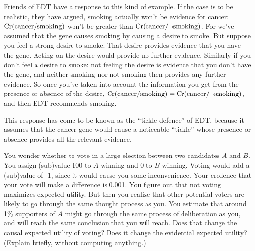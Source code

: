 Friends of EDT have a response to this kind of example. If the case is
to be realistic, they have argued, smoking actually won't be evidence
for cancer: $\text{Cr}(\text{cancer}/\text{smoking})$ won't be greater than
$\text{Cr}(\text{cancer}/\neg \text{smoking})$. For we've assumed that the
gene causes smoking by causing a desire to smoke. But suppose you feel
a strong desire to smoke. That desire provides evidence that you have
the gene. Acting on the desire would provide no further
evidence. Similarly if you don't feel a desire to smoke: not feeling
the desire is evidence that you don't have the gene, and neither
smoking nor not smoking then provides any further evidence. So once
you've taken into account the information you get from the presence or
absence of the desire,
$\text{Cr}(\text{cancer}/\text{smoking})=\text{Cr}(\text{cancer}/\neg
\text{smoking})$, and then EDT recommends smoking.

This response has come to be known as the ``tickle defence'' of EDT,
because it assumes that the cancer gene would cause a noticeable
``tickle'' whose presence or absence provides all the relevant
evidence. 

\begin{exercise1}
  You wonder whether to vote in a large election between two
  candidates $A$ and $B$. You assign (sub)value 100 to $A$ winning and
  0 to $B$ winning. Voting would add a (sub)value of -1, since it
  would cause you some inconvenience. Your credence that your vote
  will make a difference is 0.001. You figure out that not voting
  maximizes expected utility. But then you realize that other
  potential voters are likely to go through the same thought process
  as you. You estimate that around 1\% supporters of $A$ might go
  through the same process of deliberation as you, and will reach the
  same conclusion that you will reach. Does that change the causal
  expected utility of voting?  Does it change the evidential expected
  utility? (Explain briefly, without computing anything.) 
\end{exercise1}




